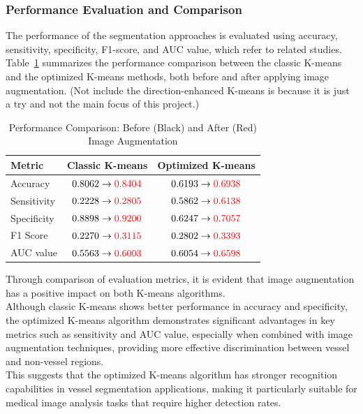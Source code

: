 \documentclass[12pt,letterpaper]{article}
\begin{document}
\subsubsection{Performance Evaluation and Comparison}
The performance of the segmentation approaches is evaluated using accuracy, sensitivity, specificity, F1-score, and AUC value, which refer to related studies. \\
Table~\ref{tab:performance} summarizes the performance comparison between the classic K-means and the optimized K-means methods, both before and after applying image augmentation. (Not include the direction-enhanced K-means is because it is just a try and not the main focus of this project.) 
\begin{table}[H]
    \centering
    \caption{Performance Comparison: Before (Black) and After (Red) Image Augmentation}
    \label{tab:performance}
    \begin{tabular}{lcc}
    \hline
    \textbf{Metric} & \textbf{Classic K-means} & \textbf{Optimized K-means} \\
    \hline
    Accuracy & $0.8062 \rightarrow \textcolor{red}{0.8404}$ & $0.6193 \rightarrow \textcolor{red}{0.6938}$ \\
    Sensitivity & $0.2228 \rightarrow \textcolor{red}{0.2805}$ & $0.5862 \rightarrow \textcolor{red}{0.6138}$ \\
    Specificity & $0.8898 \rightarrow \textcolor{red}{0.9200}$ & $0.6247 \rightarrow \textcolor{red}{0.7057}$ \\
    F1 Score   & $0.2270 \rightarrow \textcolor{red}{0.3115}$ & $0.2802 \rightarrow \textcolor{red}{0.3393}$ \\
    AUC value    & $0.5563 \rightarrow \textcolor{red}{0.6003}$ & $0.6054 \rightarrow \textcolor{red}{0.6598}$ \\
    \hline
    \end{tabular}
\end{table}
\noindent
Through comparison of evaluation metrics, it is evident that image augmentation has a positive impact on both K-means algorithms. \\
Although classic K-means shows better performance in accuracy and specificity, the optimized K-means algorithm demonstrates significant advantages in key metrics such as sensitivity and AUC value, especially when combined with image augmentation techniques, providing more effective discrimination between vessel and non-vessel regions. \\
This suggests that the optimized K-means algorithm has stronger recognition capabilities in vessel segmentation applications, making it particularly suitable for medical image analysis tasks that require higher detection rates.
\end{document}
